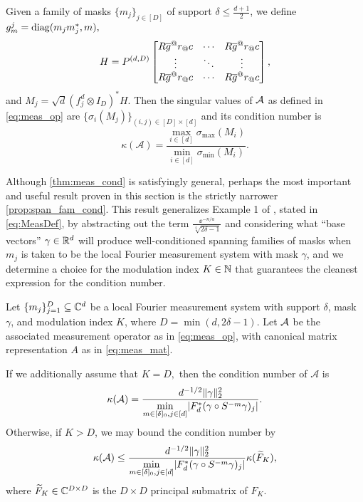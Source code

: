 \begin{theorem} \label{thm:meas_cond} \label{prop:meas_cond}
  Given a family of masks $\{m_j\}_{j \in [D]}$ of support $\delta \le \frac{d + 1}{2}$, we define $g_m^j = \operatorname{diag}(m_j m_j^*, m),$ \[H = P^{(d, D)} \cornmatfun{R \conj{g}^@r_@c}{1}{D}{1 - \delta}{\delta - 1}%
  ,\] and $M_j = \sqrt{d}\left(f_j^d \otimes I_D\right)^* H$.  Then the singular values of $\mathcal{A}$ as defined in \eqref{eq:meas_op} are $\{\sigma_i(M_j)\}_{(i, j) \in [D] \times [d]}$ and its condition number is \[\kappa(\mathcal{A}) = \dfrac{\max\limits_{i \in [d]} \sigma_{\max} (M_i)}{\min\limits_{i \in [d]} \sigma_{\min} (M_i)}.\]
\end{theorem}

Although \cref{thm:meas_cond} is satisfyingly general, perhaps the most important and useful result proven in this section is the strictly narrower \cref{prop:span_fam_cond}.  This result generalizes Example 1 of , stated in \eqref{eq:MeasDef}, by abstracting out the term $\frac{\ee^{-n/a}}{\sqrt[4]{2\delta -1}}$ and considering what ``base vectors'' $\gamma \in \mathbb{R}^d$ will produce well-conditioned spanning families of masks when $m_j$ is taken to be the local Fourier measurement system with mask $\gamma$, and we determine a choice for the modulation index $K \in \mathbb{N}$ that guarantees the cleanest expression for the condition number.  

\begin{proposition}
\label{prop:span_fam_cond}
\label{prop:gam_fam_cond}
  Let $\{m_j\}_{j = 1}^D \subseteq \mathbb{C}^d$ be a local Fourier measurement system with support $\delta$, mask $\gamma$, and modulation index $K$, where $D = \min(d, 2 \delta - 1)$.  Let $\mathcal{A}$ be the associated measurement operator as in \eqref{eq:meas_op}, with canonical matrix representation $A$ as in \eqref{eq:meas_mat}.

If we additionally assume that $K = D,$ then the condition number of $\mathcal{A}$ is \begin{equation}\kappa(\mathcal{A}) = \dfrac{d^{-1/2} \lVert\gamma\rVert_2^2}{\min\limits_{m \in [\delta]_0, j \in [d]} \lvert F_d^* (\gamma \circ S^{-m} \gamma)_j \rvert}.\label{eq:clean_cond}\end{equation}  Otherwise, if $K > D$, we may bound the condition number by \begin{equation}\kappa(\mathcal{A}) \le \dfrac{d^{-1/2} \lVert\gamma\rVert_2^2}{\min\limits_{m \in [\delta]_0, j \in [d]} \lvert F_d^* (\gamma \circ S^{-m} \gamma)_j \rvert} \kappa(\widetilde{F}_K), \label{eq:messy_cond}\end{equation} where $\widetilde{F}_K \in \mathbb{C}^{D \times D}$ is the $D \times D$ principal submatrix of $F_K$.
\end{proposition}


